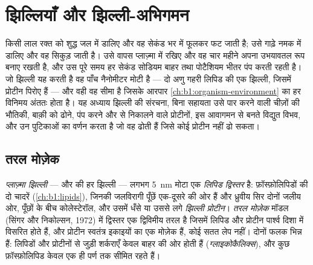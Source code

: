 \chapter{झिल्लियाँ और झिल्ली-अभिगमन}\label{ch:b1:membranes-transport}

किसी लाल रक्त  को शुद्ध जल में डालिए और वह सेकंड भर में फूलकर फट
जाती है; उसे गाढ़े नमक में डालिए और वह सिकुड़ जाती है। उसे वापस
प्लाज़्मा में रखिए और वह चार महीने अपना उभयावतल रूप बनाए रखती है, और उस
पूरे समय हर सेकंड सोडियम बाहर तथा पोटैशियम भीतर पंप करती रहती है। जो
झिल्ली यह करती है वह पाँच नैनोमीटर मोटी है --- दो अणु गहरी लिपिड की एक
झिल्ली, जिसमें प्रोटीन पिरोए हैं --- और वही वह सीमा है जिसके आरपार
\cref{ch:b1:organism-environment} का हर विनिमय अंततः होता है। यह अध्याय
झिल्ली की संरचना, बिना सहायता उसे पार करने वाली चीज़ों की भौतिकी, बाक़ी
को ढोने, पंप करने और  से निकालने वाले प्रोटीनों, इस आवागमन से बनते
विद्युत विभव, और उन पुटिकाओं का वर्णन करता है जो वह ढोती हैं जिसे कोई
प्रोटीन नहीं ढो सकता।

\section{तरल मोज़ेक}

\begin{definition}[प्लाज़्मा झिल्ली]\label{def:b1:membranes-transport:membrane}
\emph{प्लाज़्मा झिल्ली} --- और  की हर
झिल्ली --- लगभग \qty{5}{nm} मोटा एक \emph{लिपिड
द्विस्तर} है: फ़ॉस्फ़ोलिपिडों की दो चादरें
(\cref{ch:b1:lipids}), जिनकी जलविरागी पूँछें एक-दूसरे की ओर हैं और
ध्रुवीय सिर दोनों जलीय ओर, पूँछों के बीच कोलेस्टेरॉल, और उसमें धँसे या
उससे लगे \emph{झिल्ली प्रोटीन}। \emph{तरल
मोज़ेक} मॉडल (सिंगर और निकोल्सन, 1972) में
द्विस्तर एक द्विविमीय तरल है जिसमें लिपिड और प्रोटीन पार्श्व दिशा में
विसरित होते हैं, और प्रोटीन स्वतंत्र इकाइयों का एक मोज़ेक हैं, कोई सतत
लेप नहीं। दोनों फलक भिन्न हैं: लिपिडों और प्रोटीनों से जुड़ी शर्कराएँ
केवल बाहर की ओर होती हैं (\emph{ग्लाइकोकैलिक्स}), और कुछ फ़ॉस्फ़ोलिपिड
केवल एक ही पर्ण तक सीमित रहते हैं।
\end{definition}

